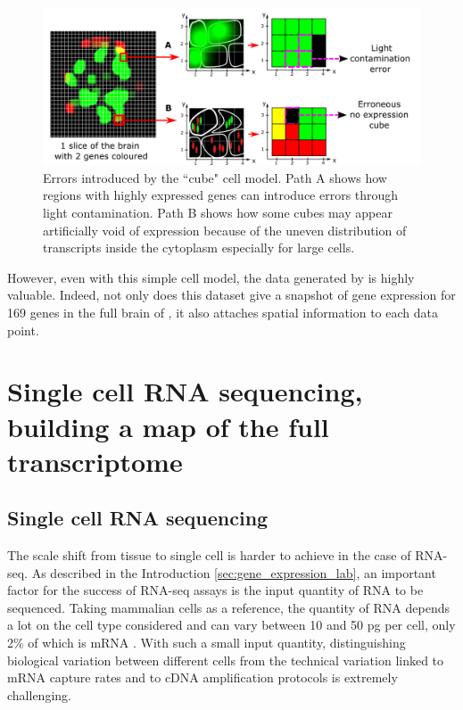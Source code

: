     \begin{figure}[h]
\centerline{\includegraphics[width=0.9\linewidth]{gfx/chapter2/cubeserrors.png}}
\caption{Errors introduced by the ``cube" cell model. Path A shows how regions with highly expressed genes can introduce errors through light contamination. Path B shows how some cubes may appear artificially void of expression because of the uneven distribution of transcripts inside the cytoplasm especially for large cells.}\label{fig:cubeserrors}
	\end{figure}
	
	However, even with this simple cell model, the data generated by \cite{Tomer10} is highly valuable. Indeed, not only does this dataset give a snapshot of gene expression for 169 genes in the full brain of \platy{}, it also attaches spatial information to each data point.\\

\section{Single cell RNA sequencing, building a map of the full transcriptome}\label{sec:single_cell_rnaseq}
  \subsection{Single cell RNA sequencing}
	The scale shift from tissue to single cell is harder to achieve in the case of RNA-seq. As described in the Introduction \ref{sec:gene_expression_lab}, an important factor for the success of RNA-seq assays is the input quantity of RNA to be sequenced. Taking mammalian cells as a reference, the quantity of RNA depends a lot on the cell type considered and can vary between 10 and 50 pg per cell, only 2\% of which is mRNA \cite{iscove02,islam11}. With such a small input quantity, distinguishing biological variation between different cells from the technical variation linked to mRNA capture rates and to cDNA amplification protocols is extremely challenging.\\

